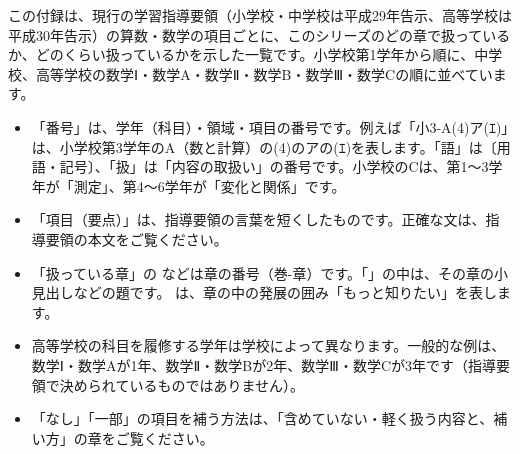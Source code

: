 \bkevenpage{}\label{kgc-a}\label{kgc-sec10}
この付録は、現行の学習指導要領（小学校・中学校は平成29年告示、高等学校は平成30年告示）の算数・数学の項目ごとに、このシリーズのどの章で扱っているか、どのくらい扱っているかを示した一覧です。小学校第1学年から順に、中学校、高等学校の数学Ⅰ・数学A・数学Ⅱ・数学B・数学Ⅲ・数学Cの順に並べています。

\begin{itemize}[leftmargin=1.2\zw, itemsep=1pt, topsep=3pt]
\item 「番号」は、学年（科目）・領域・項目の番号です。例えば「小3-A(4)ア(ｴ)」は、小学校第3学年のA（数と計算）の(4)のアの(ｴ)を表します。「語」は〔用語・記号〕、「扱」は「内容の取扱い」の番号です。小学校のCは、第1〜3学年が「測定」、第4〜6学年が「変化と関係」です。
\item 「項目（要点）」は、指導要領の言葉を短くしたものです。正確な文は、指導要領の本文をご覧ください。
\item 「扱っている章」の  などは章の番号（巻-章）です。「」の中は、その章の小見出しなどの題です。\kgcmotto{} は、章の中の発展の囲み「もっと知りたい」を表します。
\item 高等学校の科目を履修する学年は学校によって異なります。一般的な例は、数学Ⅰ・数学Aが1年、数学Ⅱ・数学Bが2年、数学Ⅲ・数学Cが3年です（指導要領で決められているものではありません）。
\item 「なし」「一部」の項目を補う方法は、「含めていない・軽く扱う内容と、補い方」の章をご覧ください。
\end{itemize}

